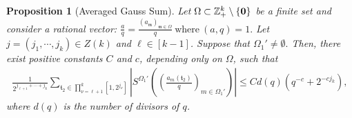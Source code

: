 \documentclass[11 pt,letterpaper]{amsart}
\theoremstyle{plain}
\newtheorem{proposition}{Proposition}\numberwithin{proposition}{section}
\theoremstyle{definition}
\theoremstyle{remark} \theoremstyle{exam} \theoremstyle{ob}
\numberwithin{equation}{section}
\begin{document}
\begin{proposition}[Averaged  Gauss Sum]\label{lem22p}
Let $\Omega\subset \mathbb{Z}_+^k \setminus \{{\bf 0}\}$ be a finite set and consider a rational vector: 
$
\frac{a}{q}=\frac{(a_{\mathfrak{m}})_{\mathfrak{m}\in \Omega}}{q}  \ \text{where}  \ (a,q)=1.$ 
Let $j=(j_1,\cdots,j_k) \in Z(k) $ and $\ell\in[k-1]$. Suppose that $\Omega_{1}'\neq \emptyset.$ Then, there exist positive constants $C$ and $c$, depending only on $\Omega$, such that
\begin{align}\label{po10}
 \frac{1}{ 2^{j_{\ell+1} +\cdots+ j_k}       } \sum_{\mathfrak{t}_2\in \prod_{\nu=\ell+1}^k [1,2^{j_\nu}] }  \left|S^{\Omega_{1}'}\left(\left( \frac{a_{m}(\mathfrak{t}_2)}{q} \right)_{m\in \Omega_{1}'}\right) \right|\le C d(q) \left(q^{-c}+2^{-cj_{k}}\right),
\end{align} 
where $d(q)$ is the number of divisors of $q$. 

 \end{proposition} 
 
 
 

 
 
\end{document}
